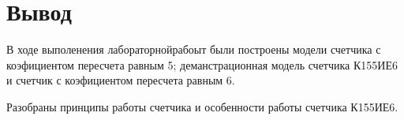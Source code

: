 \section*{Вывод}


В ходе выполенения  лабораторнойрабоыт были построены модели счетчика с коэфициентом пересчета
равным 5; деманстрационная модель счетчика К155ИЕ6 и счетчик с коэфициентом пересчета равным 6. \par

Разобраны принципы работы счетчика и особенности работы счетчика К155ИЕ6.